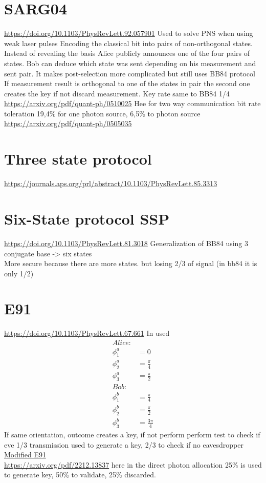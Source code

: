 \documentclass[12pt,a4paper]{article}
\begin{document}
\section{SARG04}
\url{https://doi.org/10.1103/PhysRevLett.92.057901}
Used to solve PNS when using weak laser pulses
Encoding the classical bit into pairs of non-orthogonal states.
Instead of revealing the basis Alice publicly announces one of the four pairs of states. Bob can deduce which state was sent depending on his measurement and sent pair. It makes post-selection more complicated but still uses BB84 protocol
If measurement result is orthogonal to one of the states in pair the second one creates the key if not discard measurement.
Key rate same to BB84 1/4
\url{https://arxiv.org/pdf/quant-ph/0510025} Hee for two way communication bit rate toleration 19,4\% for one photon source, 6,5\% to photon source
\url{https://arxiv.org/pdf/quant-ph/0505035}
\section{Three state protocol}
\url{https://journals.aps.org/prl/abstract/10.1103/PhysRevLett.85.3313}
\section{Six-State protocol SSP}
\url{https://doi.org/10.1103/PhysRevLett.81.3018}
Generalization of BB84 using 3 conjugate base -> six states \\More secure because there are more states. but losing 2/3 of signal (in bb84 it is only 1/2)
\section{E91}
\url{https://doi.org/10.1103/PhysRevLett.67.661}
In \cite{ekert1991quantum} used
\begin{align*}
Alice: \\
\phi_1^a &= 0 \\
\phi_2^a &= \frac{\pi}{4} \\
\phi_3^a &= \frac{\pi}{2} \\
Bob: \\
\phi_1^b &= \frac{\pi}{4} \\
\phi_2^b &= \frac{\pi}{2} \\
\phi_3^b &= \frac{3\pi}{4}
\end{align*}
If same orientation, outcome creates a key, if not perform perform test to check if eve
1/3 transmission used to generate a key, 2/3 to check if no eavesdropper \\
\href{https://journals.sagepub.com/doi/full/10.1177/1550147718778192} {Modified E91} \\ 
\url{https://arxiv.org/pdf/2212.13837} here in the direct photon allocation 25\% is used to generate key, 50\% to validate, 25\% discarded.
\end{document}
